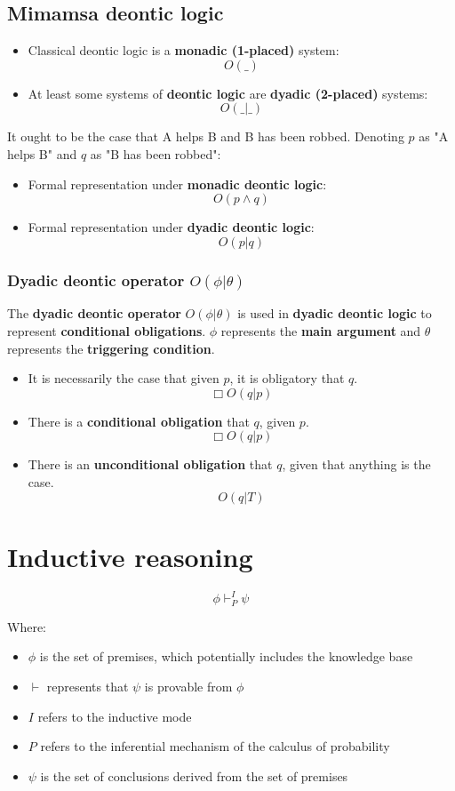 \documentclass[11pt]{article}
\begin{document}
\subsection{Mimamsa deontic logic}
\label{sec:org1b84cfd}
\begin{itemize}
\item Classical deontic logic is a \textbf{monadic (1-placed)} system:
\[O(\_)\]
\item At least some systems of \textbf{deontic logic} are \textbf{dyadic (2-placed)} systems:
\[O(\_ | \_)\]
\end{itemize}

It ought to be the case that A helps B and B has been robbed. Denoting \(p\) as "A helps B" and \(q\) as "B has been robbed":
\begin{itemize}
\item Formal representation under \textbf{monadic deontic logic}:
\[O(p \wedge q)\]
\item Formal representation under \textbf{dyadic deontic logic}:
\[O(p | q)\]
\end{itemize}
\subsubsection{Dyadic deontic operator \(O(\phi | \theta)\)}
\label{sec:orga0c1177}
The \textbf{dyadic deontic operator} \(O(\phi | \theta)\) is used in \textbf{dyadic deontic logic} to represent \textbf{conditional obligations}. \(\phi\) represents the \textbf{main argument} and \(\theta\) represents the \textbf{triggering condition}.

\begin{itemize}
\item It is necessarily the case that given \(p\), it is obligatory that \(q\).
\[\Box O (q | p)\]
\item There is a \textbf{conditional obligation} that \(q\), given \(p\).
\[\Box O (q | p)\]
\item There is an \textbf{unconditional obligation} that \(q\), given that anything is the case.
\[O (q | T)\]
\end{itemize}
\section{Inductive reasoning}
\label{sec:org38c9449}
\[\phi \vdash^{I}_{P} \psi\]

Where:
\begin{itemize}
\item \(\phi\) is the set of premises, which potentially includes the knowledge base
\item \(\vdash\) represents that \(\psi\) is provable from \(\phi\)
\item \(I\) refers to the inductive mode
\item \(P\) refers to the inferential mechanism of the calculus of probability
\item \(\psi\) is the set of conclusions derived from the set of premises
\end{itemize}
\end{document}
